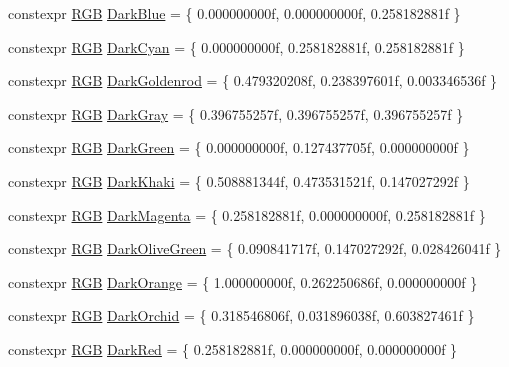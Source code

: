 \begin{DoxyCompactItemize}
\item 
constexpr \hyperlink{structmage_1_1_r_g_b}{R\+GB} \hyperlink{namespacemage_1_1color_abdd3f39d1060d9d691eba6726b5455cc}{Dark\+Blue} = \{ 0.\+000000000f, 0.\+000000000f, 0.\+258182881f \}
\item 
constexpr \hyperlink{structmage_1_1_r_g_b}{R\+GB} \hyperlink{namespacemage_1_1color_a69f91a91d64036b98384c4d312c848ea}{Dark\+Cyan} = \{ 0.\+000000000f, 0.\+258182881f, 0.\+258182881f \}
\item 
constexpr \hyperlink{structmage_1_1_r_g_b}{R\+GB} \hyperlink{namespacemage_1_1color_a50ec8ddc7d55e5286b0b2f01ab690b2b}{Dark\+Goldenrod} = \{ 0.\+479320208f, 0.\+238397601f, 0.\+003346536f \}
\item 
constexpr \hyperlink{structmage_1_1_r_g_b}{R\+GB} \hyperlink{namespacemage_1_1color_abe66674f72bdb34922b39b4ed1892159}{Dark\+Gray} = \{ 0.\+396755257f, 0.\+396755257f, 0.\+396755257f \}
\item 
constexpr \hyperlink{structmage_1_1_r_g_b}{R\+GB} \hyperlink{namespacemage_1_1color_a810f271efcbd9574bec9076a18c30476}{Dark\+Green} = \{ 0.\+000000000f, 0.\+127437705f, 0.\+000000000f \}
\item 
constexpr \hyperlink{structmage_1_1_r_g_b}{R\+GB} \hyperlink{namespacemage_1_1color_a1673eb9031256e1ba8f8438168803eef}{Dark\+Khaki} = \{ 0.\+508881344f, 0.\+473531521f, 0.\+147027292f \}
\item 
constexpr \hyperlink{structmage_1_1_r_g_b}{R\+GB} \hyperlink{namespacemage_1_1color_a6a72bd256475a691285a9ac994d95361}{Dark\+Magenta} = \{ 0.\+258182881f, 0.\+000000000f, 0.\+258182881f \}
\item 
constexpr \hyperlink{structmage_1_1_r_g_b}{R\+GB} \hyperlink{namespacemage_1_1color_adb31ce54111ec7b2643ee262367b60a3}{Dark\+Olive\+Green} = \{ 0.\+090841717f, 0.\+147027292f, 0.\+028426041f \}
\item 
constexpr \hyperlink{structmage_1_1_r_g_b}{R\+GB} \hyperlink{namespacemage_1_1color_ab204ba538e4ca171b5ae250023e334b0}{Dark\+Orange} = \{ 1.\+000000000f, 0.\+262250686f, 0.\+000000000f \}
\item 
constexpr \hyperlink{structmage_1_1_r_g_b}{R\+GB} \hyperlink{namespacemage_1_1color_ae1054dbb15cd00a4ffb9c5644d8e2319}{Dark\+Orchid} = \{ 0.\+318546806f, 0.\+031896038f, 0.\+603827461f \}
\item 
constexpr \hyperlink{structmage_1_1_r_g_b}{R\+GB} \hyperlink{namespacemage_1_1color_af3e92bec90aaaae7e505af23ff81ecdf}{Dark\+Red} = \{ 0.\+258182881f, 0.\+000000000f, 0.\+000000000f \}
\item 

\end{DoxyCompactItemize}
